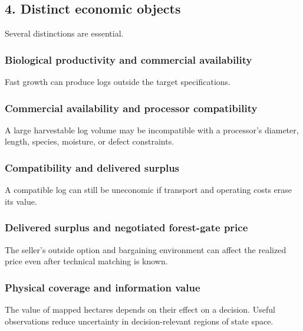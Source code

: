 \subsection{4. Distinct economic objects}\label{distinct-economic-objects}

Several distinctions are essential.

\subsubsection{Biological productivity and commercial availability}\label{biological-productivity-and-commercial-availability}

Fast growth can produce logs outside the target specifications.

\subsubsection{Commercial availability and processor compatibility}\label{commercial-availability-and-processor-compatibility}

A large harvestable log volume may be incompatible with a processor's diameter,
length, species, moisture, or defect constraints.

\subsubsection{Compatibility and delivered surplus}\label{compatibility-and-delivered-surplus}

A compatible log can still be uneconomic if transport and operating costs erase
its value.

\subsubsection{Delivered surplus and negotiated forest-gate price}\label{delivered-surplus-and-negotiated-forest-gate-price}

The seller's outside option and bargaining environment can affect the realized
price even after technical matching is known.

\subsubsection{Physical coverage and information value}\label{physical-coverage-and-information-value}

The value of mapped hectares depends on their effect on a decision. Useful
observations reduce uncertainty in decision-relevant regions of state space.

